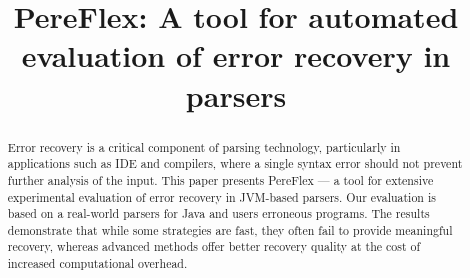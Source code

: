 \documentclass[conference]{IEEEtran}
\begin{document}
\title{PereFlex: A tool for automated evaluation of error recovery in parsers\\
}

\author{
\and
{}
\and
{}

\linebreakand

\and
{}
\and
{}
}
\maketitle

\begin{abstract}

Error recovery is a critical component of parsing technology, particularly in applications such as IDE and compilers, where a single syntax error should not prevent further analysis of the input. This paper presents PereFlex --- a tool for extensive experimental evaluation of error recovery in JVM-based parsers. Our evaluation is based on a real-world parsers for Java and users erroneous programs. The results demonstrate that while some strategies are fast, they often fail to provide meaningful recovery, whereas advanced methods offer better recovery quality at the cost of increased computational overhead.

\end{abstract}
\end{document}

